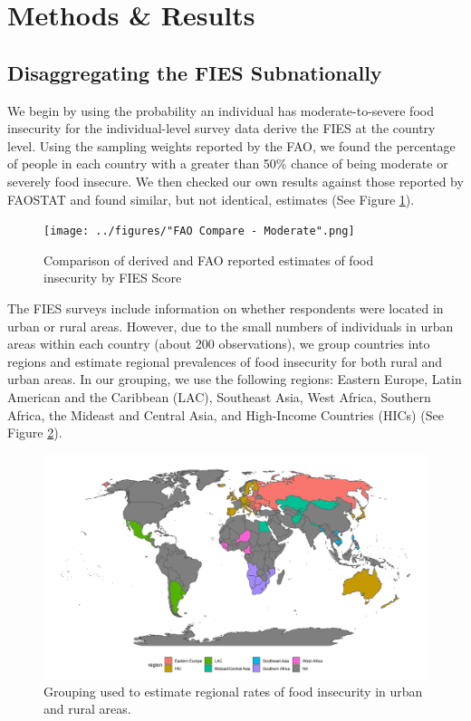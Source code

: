 \documentclass{article}
\begin{document}
\section{Methods \& Results}
\subsection{Disaggregating the FIES Subnationally}
We begin by using the probability an individual has moderate-to-severe food insecurity for the individual-level survey data derive the FIES at the country level.  Using the sampling weights reported by the FAO, we found the percentage of people in each country with a greater than 50\% chance of being moderate or severely food insecure. We then checked our own results against those reported by FAOSTAT and found similar, but not identical, estimates (See Figure \ref{fig:comparison}).

\begin{figure}[h]
	\centering
	\texttt{[image: ../figures/"FAO Compare - Moderate".png]}
	\caption{Comparison of derived and FAO reported estimates of food insecurity by FIES Score}
	\label{fig:comparison}
\end{figure}

The FIES surveys include information on whether respondents were located in urban or rural areas.  However, due to the small numbers of individuals in urban areas within each country (about 200 observations), we group countries into regions and estimate regional prevalences of food insecurity for both rural and urban areas.  In our grouping, we use the following regions: Eastern Europe, Latin American and the Caribbean (LAC), Southeast Asia, West Africa, Southern Africa, the Mideast and Central Asia, and High-Income Countries (HICs) (See Figure \ref{fig:regions}).

\begin{figure}[h]
	\centering
	\includegraphics[width=\linewidth]{../figures/regions.png}
	\caption{Grouping used to estimate regional rates of food insecurity in urban and rural areas.}
	\label{fig:regions}
\end{figure}
\end{document}
